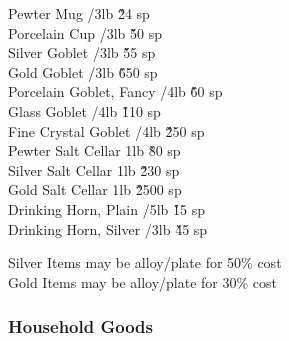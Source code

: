 \begin{multicols}{3}
{\begin{tabbing}
Pewter Mug				/3lb		\' \` 24 sp \\
Porcelain Cup				/3lb		\' \` 50 sp \\
Silver Goblet				/3lb		\' \` 55 sp \\
Gold Goblet				/3lb		\' \` 650 sp \\
Porcelain Goblet, Fancy			/4lb		\' \` 60 sp \\
Glass Goblet				/4lb		\' \` 110 sp \\
Fine Crystal Goblet			/4lb		\' \` 250 sp \\
Pewter Salt Cellar			\> 1lb			\' \` 80 sp \\
Silver Salt Cellar			\> 1lb			\' \` 230 sp \\
Gold Salt Cellar			\> 1lb			\' \` 2500 sp \\
Drinking Horn, Plain			/5lb		\' \` 15 sp \\
Drinking Horn, Silver			/3lb		\' \` 45 sp \\
\end{tabbing}
Silver Items may be alloy/plate for 50\% cost \\
Gold Items may be alloy/plate for 30\% cost \\

\subsubsection{Household Goods}

}
\end{multicols}
